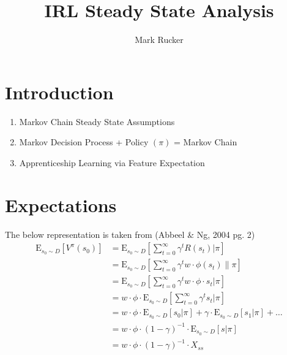 \documentclass[12pt]{article}
\begin{document}
			
	\title{IRL Steady State Analysis}
	\author{Mark Rucker}
	\maketitle
	


	\section{Introduction}
		\begin{enumerate}
			\item Markov Chain Steady State Assumptions
			\item Markov Decision Process + Policy $(\pi)$ = Markov Chain
			\item Apprenticeship Learning via Feature Expectation 
		\end{enumerate}
	\section{Expectations}
		The below representation is taken from (Abbeel \& Ng, 2004 pg. 2)
		\begin{align}
			\text{E}_{s_0 \sim D}[V^\pi(s_0)] &= \text{E}_{s_0 \sim D}[\sum_{t=0}^{\infty} \gamma^tR(s_t) | \pi ] \\
                                  &= \text{E}_{s_0 \sim D}[\sum_{t=0}^{\infty} \gamma^t w \cdot \phi(s_t) \| \pi ] \\
                                  &= \text{E}_{s_0 \sim D}[\sum_{t=0}^{\infty} \gamma^t w \cdot \phi \cdot s_t | \pi ] \label{eq:1}\\
                                  &= w \cdot \phi \cdot \text{E}_{s_0 \sim D}[\sum_{t=0}^{\infty} \gamma^t s_t | \pi ] \\
                                  &= w \cdot \phi \cdot \text{E}_{s_0 \sim D}[ s_0 | \pi ] + \gamma \cdot \text{E}_{s_0 \sim D}[ s_1 | \pi ] + \dots \\
                                  &= w \cdot \phi \cdot (1-\gamma)^{-1} \cdot \text{E}_{s_0 \sim D}[ s | \pi ] \label{eq:2} \\ 
                                  &= w \cdot \phi \cdot (1-\gamma)^{-1} \cdot X_{ss} \label{eq:3}
		\end{align}
		
\end{document}
